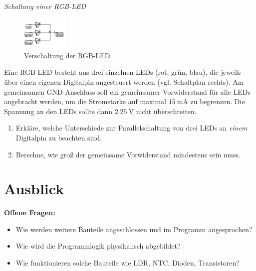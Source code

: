 \begin{aufgabe} \emph{Schaltung einer RGB-LED}
	
	\begin{figure}
		\vspace{-\baselineskip}
		\centering
		\includegraphics[width=0.2\textwidth]{./pics/rgb-led-schaltplan.png}
		\caption{Verschaltung der RGB-LED.}
		\vspace{-\baselineskip}
	\end{figure}
	Eine RGB-LED besteht aus drei einzelnen LEDs (rot, grün, blau), die jeweils über einen eigenen Digitalpin angesteuert werden (vgl. Schaltplan rechts). Am gemeinsamen GND-Anschluss soll ein gemeinsamer Vorwiderstand für alle LEDs angebracht werden, um die Stromstärke auf maximal $\SI{15}{\milli\ampere}$ zu begrenzen. Die Spannung an den LEDs sollte dann $\SI{2,25}{\volt}$ nicht überschreiten.
	\begin{enumerate}[label=\alph*), itemsep=0ex]
		\item Erkläre, welche Unterschiede zur Parallelschaltung von drei LEDs an \emph{einem} Digitalpin zu beachten sind.
		\item Berechne, wie groß der gemeinsame Vorwiderstand mindestens sein muss.
	\end{enumerate}
\end{aufgabe}

\newpage
\section{Ausblick}\label{sec:ausblick-elektrik}

\begin{ziel}
	\textbf{Offene Fragen:}
	
	\begin{itemize}[itemsep=0ex,parsep=0ex]
		\item Wie werden weitere Bauteile angeschlossen und im Programm angesprochen?
		\item Wie wird die Programmlogik physikalisch abgebildet? %
		\item Wie funktionieren solche Bauteile wie LDR, NTC, Dioden, Transistoren?
	\end{itemize}
\end{ziel}

